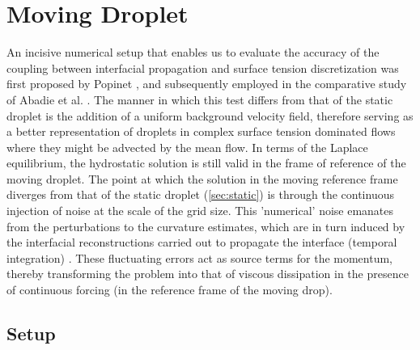 
\section{Moving Droplet}

An incisive numerical setup that enables us to evaluate the accuracy of the coupling between interfacial propagation and surface tension discretization was first proposed by Popinet \cite{popinet2009accurate}, and subsequently employed in the comparative study of Abadie et al. . The manner in which this test differs from that of the static droplet is the addition of a uniform background velocity field, therefore serving as a better representation of droplets in complex surface tension dominated flows where they might be advected by the mean flow. In terms of the Laplace equilibrium, the hydrostatic solution is still valid in the frame of reference of the moving droplet. The point at which the solution in the moving reference frame diverges from that of the static droplet (\ref{sec:static}) is through the continuous injection of noise at the scale of the grid size. This 'numerical' noise emanates from the perturbations to the curvature estimates, which are in turn induced by the interfacial reconstructions carried out to propagate the interface (temporal integration) . These fluctuating errors act as source terms for the momentum, thereby transforming the problem into that of viscous dissipation in the presence of continuous forcing (in the reference frame of the moving drop).

\subsection*{Setup}

